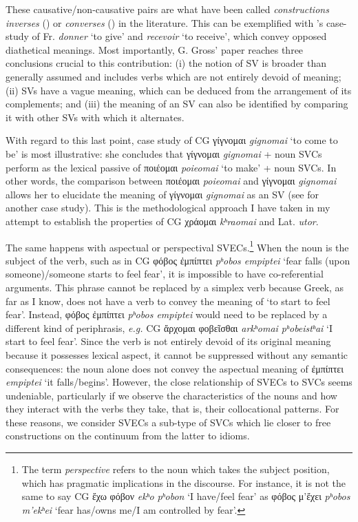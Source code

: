 \documentclass[output=paper,colorlinks,citecolor=brown]{langscibook}
\begin{document}
These causative/non-causative pairs are what have been called \emph{constructions
  inverses} (\cite{gross_cas_1982}) or \emph{converses} (\cite{gross_les_1989}) in the
literature. This can be exemplified with \citet{gross_cas_1982}'s case-study of Fr.
\emph{donner} `to give' and \emph{recevoir} `to receive', which convey opposed diathetical
meanings. Most importantly, G. Gross' paper reaches three conclusions crucial to this
contribution: (i) the notion of SV is broader than generally assumed and includes verbs
which are not entirely devoid of meaning; (ii) SVs have a vague meaning, which can be
deduced from the arrangement of its complements; and (iii) the meaning of an SV can also be
identified by comparing it with other SVs with which it alternates.

With regard to this last point, \citet{jimenez_lopez__2021} case study of CG γίγνομαι
\emph{gignomai} `to come to be' is most illustrative: she concludes that γίγνομαι
\emph{gignomai} + noun SVCs perform as the lexical passive of ποιέομαι \emph{poieomai} `to
make' + noun SVCs. In other words, the comparison between ποιέομαι \emph{poieomai} and
γίγνομαι \emph{gignomai} allows her to elucidate the meaning of γίγνομαι \emph{gignomai}
as an SV (see \citet{vives_cuesta__2021} for another case study). This is the
methodological approach I have taken in my attempt to establish the properties of CG
χράομαι \emph{kʰraomai} and Lat. \emph{utor}.

The same happens with aspectual or perspectival SVECs.\footnote{The term
  \emph{perspective} refers to the noun which takes the subject position, which has
  pragmatic implications in the discourse. For instance, it is not the same to say CG ἔχω
  φόβον \emph{ekʰo} \emph{pʰobon} `I have/feel fear'
  as φόβος μ'ἔχει \emph{pʰobos m'ekʰei} `fear
  has/owns me/I am controlled by fear'.} When the noun is the subject of the verb, such as
in CG φόβος ἐμπίπτει \emph{pʰobos empiptei} `fear falls (upon
someone)/someone starts to feel fear', it is impossible to have co-referential
arguments. This phrase cannot be replaced by a simplex verb because Greek, as far as I
know, does not have a verb to convey the meaning of `to start to feel fear'. Instead,
φόβος ἐμπίπτει \emph{pʰobos empiptei} would need to be replaced by a
different kind of periphrasis, \emph{e.g.} CG ἄρχομαι φοβεῖσθαι
\emph{arkʰomai pʰobeistʰai} `I start
to feel fear'. Since the verb is not entirely devoid of its
original meaning because it possesses lexical aspect, it cannot be suppressed without any
semantic consequences: the noun alone does not convey the aspectual meaning of ἐμπίπτει
\emph{empiptei} `it falls/begins'. However, the close relationship of SVECs to SVCs seems
undeniable, particularly if we observe the characteristics of the nouns and how they
interact with the verbs they take, that is, their collocational patterns. For these
reasons, we consider SVECs a sub-type of SVCs which lie closer to free constructions on
the continuum from the latter to idioms.
\end{document}
